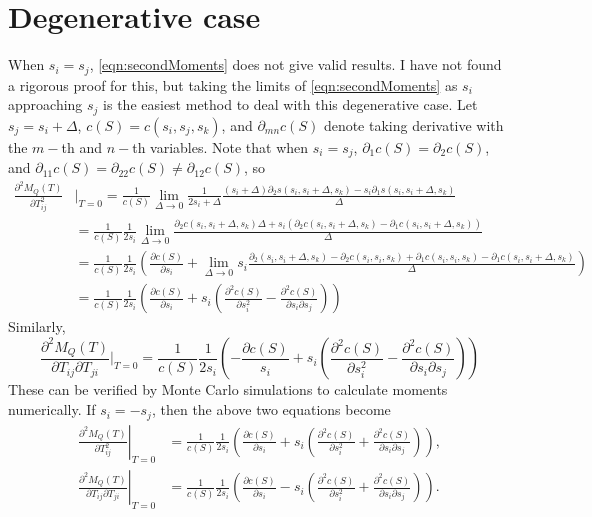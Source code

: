 \documentclass[10pt]{article}
\begin{document}
\section{Degenerative case}
When $s_i=s_j$, \eqref{eqn:secondMoments} does not give valid results.
I have not found a rigorous proof for this, but taking the limits of \eqref{eqn:secondMoments} as $s_i$ approaching $s_j$ is the easiest method to deal with this degenerative case.
Let $s_j=s_i+\Delta$, $c(S) = c(s_i,s_j,s_k)$, and $\partial_{mn}c(S)$ denote taking derivative with the $m-$th and $n-$th variables.
Note that when $s_i=s_j$, $\partial_1c(S) = \partial_2c(S)$, and $\partial_{11}c(S) = \partial_{22}c(S) \neq \partial_{12}c(S)$, so
\begin{align} \label{eqn: dege-Qijij}
	\frac{\partial^2 M_Q(T)}{\partial T_{ij}^2}&\bigg|_{T=0} = \frac{1}{c(S)} \lim\limits_{\Delta\to 0} \frac{1}{2s_i+\Delta} \frac{ (s_i+\Delta)\partial_2s(s_i,s_i+\Delta,s_k) - s_i\partial_1s(s_i,s_i+\Delta,s_k)}{\Delta} \nonumber \\
	&= \frac{1}{c(S)}\frac{1}{2s_i} \lim\limits_{\Delta\to 0} \frac{\partial_2c(s_i,s_i+\Delta,s_k)\Delta + s_i \left(  \partial_2c(s_i,s_i+\Delta,s_k) - \partial_1c(s_i,s_i+\Delta,s_k) \right)}{\Delta} \nonumber \\
	&= \frac{1}{c(S)}\frac{1}{2s_i} \left( \frac{\partial c(S)}{\partial s_i} + \lim\limits_{\Delta\to 0} s_i\frac{\partial_2(s_i,s_i+\Delta,s_k) - \partial_2c(s_i,s_i,s_k) + \partial_1c(s_i,s_i,s_k) - \partial_1c(s_i,s_i+\Delta,s_k)}{\Delta} \right) \nonumber \\
	&= \frac{1}{c(S)}\frac{1}{2s_i} \left( \frac{\partial c(S)}{\partial s_i} + s_i\left( \frac{\partial^2 c(S)}{\partial s_i^2} - \frac{\partial^2 c(S)}{\partial s_i \partial s_j} \right) \right)
\end{align}
Similarly,
\begin{equation} \label{eqn: dege-Qijji}
	\frac{\partial^2 M_Q(T)}{\partial T_{ij}\partial T_{ji}}\bigg|_{T=0} = \frac{1}{c(S)}\frac{1}{2s_i}\left( -\frac{\partial c(S)}{s_i} + s_i\left( \frac{\partial^2 c(S)}{\partial s_i^2} - \frac{\partial^2 c(S)}{\partial s_i \partial s_j} \right) \right)
\end{equation}
These can be verified by Monte Carlo simulations to calculate moments numerically.
If $s_i=-s_j$, then the above two equations become
\begin{align}
	\left. \frac{\partial^2 M_Q(T)}{\partial T_{ij}^2} \right|_{T=0} &= \frac{1}{c(S)} \frac{1}{2s_i} \left( \frac{\partial c(S)}{\partial s_i}  + s_i\left( \frac{\partial^2 c(S)}{\partial s_i^2} + \frac{\partial^2 c(S)}{\partial s_i \partial s_j} \right) \right), \\
	\left. \frac{\partial^2 M_Q(T)}{\partial T_{ij} \partial T_{ji}} \right|_{T=0} &= \frac{1}{c(S)} \frac{1}{2s_i} \left( \frac{\partial c(S)}{\partial s_i} - s_i\left( \frac{\partial^2 c(S)}{\partial s_i^2} + \frac{\partial^2 c(S)}{\partial s_i \partial s_j} \right) \right).
\end{align}
\end{document}
